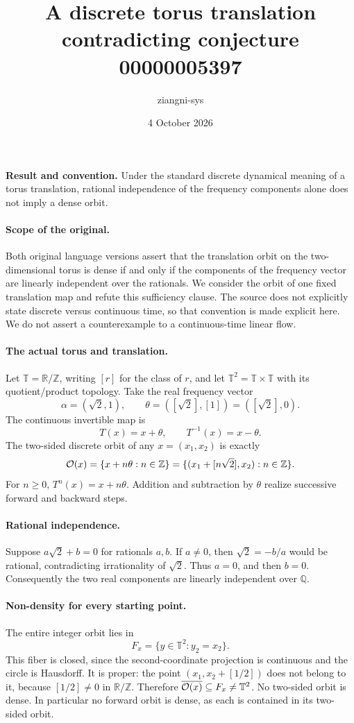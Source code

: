 \documentclass[11pt]{article}
\title{A discrete torus translation contradicting conjecture 00000005397}
\author{ziangni-sys}
\date{4 October 2026}
\begin{document}
\raggedright
\maketitle
\noindent\textbf{Result and convention.} Under the standard discrete dynamical meaning of a torus translation, rational independence of the frequency components alone does not imply a dense orbit.

\paragraph{Scope of the original.}
Both original language versions assert that the translation orbit on the two-dimensional torus is dense if and only if the components of the frequency vector are linearly independent over the rationals. We consider the orbit of one fixed translation map and refute this sufficiency clause. The source does not explicitly state discrete versus continuous time, so that convention is made explicit here. We do not assert a counterexample to a continuous-time linear flow.

\paragraph{The actual torus and translation.}
Let \(\mathbb T=\mathbb R/\mathbb Z\), writing \([r]\) for the class of \(r\), and let \(\mathbb T^2=\mathbb T\times\mathbb T\) with its quotient/product topology. Take the real frequency vector
\[
 \alpha=(\sqrt2,1),\qquad
 \theta=([\sqrt2],[1])=([\sqrt2],0).
\]
The continuous invertible map is
\[
 T(x)=x+\theta,\qquad T^{-1}(x)=x-\theta.
\]
The two-sided discrete orbit of any \(x=(x_1,x_2)\) is exactly
\[
 {\cal O}(x)=\{x+n\theta:n\in\mathbb Z\}
 =\{(x_1+[n\sqrt2],x_2):n\in\mathbb Z\}.
\]
For \(n\geq0\), \(T^n(x)=x+n\theta\). Addition and subtraction by \(\theta\) realize successive forward and backward steps.

\paragraph{Rational independence.}
Suppose \(a\sqrt2+b=0\) for rationals \(a,b\).
If \(a\ne0\), then \(\sqrt2=-b/a\) would be rational, contradicting irrationality of \(\sqrt2\). Thus \(a=0\), and then \(b=0\). Consequently the two real components are linearly independent over \(\mathbb Q\).

\paragraph{Non-density for every starting point.}
The entire integer orbit lies in
\[
 F_x=\{y\in\mathbb T^2:y_2=x_2\}.
\]
This fiber is closed, since the second-coordinate projection is continuous and the circle is Hausdorff. It is proper: the point
\((x_1,x_2+[1/2])\) does not belong to it, because \([1/2]\ne0\) in \(\mathbb R/\mathbb Z\). Therefore
\(\overline{{\cal O}(x)}\subseteq F_x\ne\mathbb T^2\).
No two-sided orbit is dense. In particular no forward orbit is dense, as each is contained in its two-sided orbit.
\newpage
\end{document}
